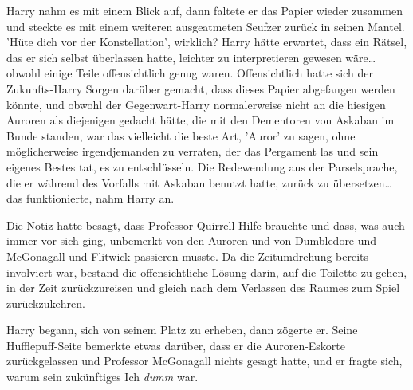 Harry nahm es mit einem Blick auf, dann faltete er das Papier wieder zusammen und steckte es mit einem weiteren ausgeatmeten Seufzer zurück in seinen Mantel.
'Hüte dich vor der Konstellation', wirklich? Harry hätte erwartet, dass ein Rätsel, das er sich selbst überlassen hatte, leichter zu interpretieren gewesen wäre… obwohl einige Teile offensichtlich genug waren. Offensichtlich hatte sich der Zukunfts-Harry Sorgen darüber gemacht, dass dieses Papier abgefangen werden könnte, und obwohl der Gegenwart-Harry normalerweise nicht an die hiesigen Auroren als diejenigen gedacht hätte, die mit den Dementoren von Askaban im Bunde standen, war das vielleicht die beste Art, 'Auror' zu sagen, ohne möglicherweise irgendjemanden zu verraten, der das Pergament las und sein eigenes Bestes tat, es zu entschlüsseln.
Die Redewendung aus der Parselsprache, die er während des Vorfalls mit Askaban benutzt hatte, zurück zu übersetzen… das funktionierte, nahm Harry an.

Die Notiz hatte besagt, dass Professor Quirrell Hilfe brauchte und dass, was auch immer vor sich ging, unbemerkt von den Auroren und von Dumbledore und McGonagall und Flitwick passieren musste. Da die Zeitumdrehung bereits involviert war, bestand die offensichtliche Lösung darin, auf die Toilette zu gehen, in der Zeit zurückzureisen und gleich nach dem Verlassen des Raumes zum Spiel zurückzukehren.

Harry begann, sich von seinem Platz zu erheben, dann zögerte er.
Seine Hufflepuff-Seite bemerkte etwas darüber, dass er die Auroren-Eskorte zurückgelassen und Professor McGonagall nichts gesagt hatte, und er fragte sich, warum sein zukünftiges Ich \emph{dumm} war.

